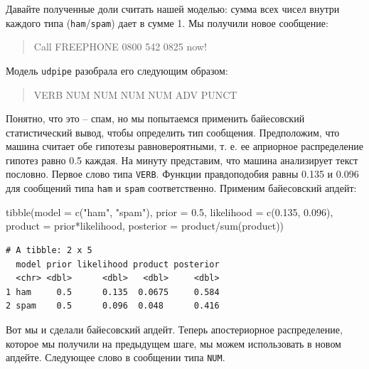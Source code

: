 \documentclass[
]{book}
\newenvironment{Shaded}{\begin{snugshade}}{\end{snugshade}}
\newcommand{\AttributeTok}[1]{\textcolor[rgb]{0.77,0.63,0.00}{#1}}
\newcommand{\FloatTok}[1]{\textcolor[rgb]{0.00,0.00,0.81}{#1}}
\newcommand{\FunctionTok}[1]{\textcolor[rgb]{0.00,0.00,0.00}{#1}}
\newcommand{\NormalTok}[1]{#1}
\newcommand{\SpecialCharTok}[1]{\textcolor[rgb]{0.00,0.00,0.00}{#1}}
\newcommand{\StringTok}[1]{\textcolor[rgb]{0.31,0.60,0.02}{#1}}
\begin{document}
Давайте полученные доли считать нашей моделью: сумма всех чисел внутри каждого типа (\texttt{ham}/\texttt{spam}) дает в сумме 1. Мы получили новое сообщение:

\begin{quote}
Call FREEPHONE 0800 542 0825 now!
\end{quote}

Модель \texttt{udpipe} разобрала его следующим образом:

\begin{quote}
VERB NUM NUM NUM NUM ADV PUNCT
\end{quote}

Понятно, что это -- спам, но мы попытаемся применить байесовский статистический вывод, чтобы определить тип сообщения. Предположим, что машина считает обе гипотезы равновероятными, т. е. ее априорное распределение гипотез равно 0.5 каждая. На минуту представим, что машина анализирует текст пословно. Первое слово типа \texttt{VERB}. Функции правдоподобия равны 0.135 и 0.096 для сообщений типа \texttt{ham} и \texttt{spam} соответственно. Применим байесовский апдейт:

\begin{Shaded}
\begin{Highlighting}[]
\FunctionTok{tibble}\NormalTok{(}\AttributeTok{model =} \FunctionTok{c}\NormalTok{(}\StringTok{"ham"}\NormalTok{, }\StringTok{"spam"}\NormalTok{),}
       \AttributeTok{prior =} \FloatTok{0.5}\NormalTok{,}
       \AttributeTok{likelihood =} \FunctionTok{c}\NormalTok{(}\FloatTok{0.135}\NormalTok{, }\FloatTok{0.096}\NormalTok{),}
       \AttributeTok{product =}\NormalTok{ prior}\SpecialCharTok{*}\NormalTok{likelihood,}
       \AttributeTok{posterior =}\NormalTok{ product}\SpecialCharTok{/}\FunctionTok{sum}\NormalTok{(product))}
\end{Highlighting}
\end{Shaded}

\begin{verbatim}
# A tibble: 2 x 5
  model prior likelihood product posterior
  <chr> <dbl>      <dbl>   <dbl>     <dbl>
1 ham     0.5      0.135  0.0675     0.584
2 spam    0.5      0.096  0.048      0.416
\end{verbatim}

Вот мы и сделали байесовский апдейт. Теперь апостериорное распределение, которое мы получили на предыдущем шаге, мы можем использовать в новом апдейте. Следующее слово в сообщении типа \texttt{NUM}.
\end{document}
